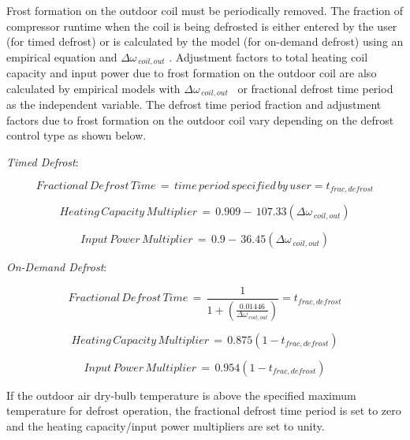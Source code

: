 Frost formation on the outdoor coil must be periodically removed. The fraction of compressor runtime when the coil is being defrosted is either entered by the user (for timed defrost) or is calculated by the model (for on-demand defrost) using an empirical equation and \(\Delta {\omega_{\,coil,out}}\) . Adjustment factors to total heating coil capacity and input power due to frost formation on the outdoor coil are also calculated by empirical models with \(\Delta {\omega_{\,coil,out}}\) ~or fractional defrost time period as the independent variable. The defrost time period fraction and adjustment factors due to frost formation on the outdoor coil vary depending on the defrost control type as shown below.

\emph{Timed Defrost}:

\begin{equation}
Fractional\,Defrost\,Time\, = \,time\,period\,specified\,by\,user = {t_{frac,defrost}}
\end{equation}

\begin{equation}
Heating\,Capacity\,Multiplier\, = \,0.909 - \,107.33\left( {\Delta {\omega_{\,coil,out}}} \right)
\end{equation}

\begin{equation}
Input\,Power\,Multiplier\, = \,0.9 - \,36.45\left( {\Delta {\omega_{\,coil,out}}} \right)
\end{equation}

\emph{On-Demand Defrost}:

\begin{equation}
Fractional\,Defrost\,Time\, = \,\frac{1}{{1 + \left( {\frac{{0.01446}}{{\Delta {\omega_{\,coil,out}}}}} \right)}} = {t_{frac,defrost}}
\end{equation}

\begin{equation}
Heating\,Capacity\,Multiplier\, = \,0.875\left( {1 - {t_{frac,defrost}}} \right)
\end{equation}

\begin{equation}
Input\,Power\,Multiplier\, = \,0.954\left( {1 - {t_{frac,defrost}}} \right)
\end{equation}

If the outdoor air dry-bulb temperature is above the specified maximum temperature for defrost operation, the fractional defrost time period is set to zero and the heating capacity/input power multipliers are set to unity.

